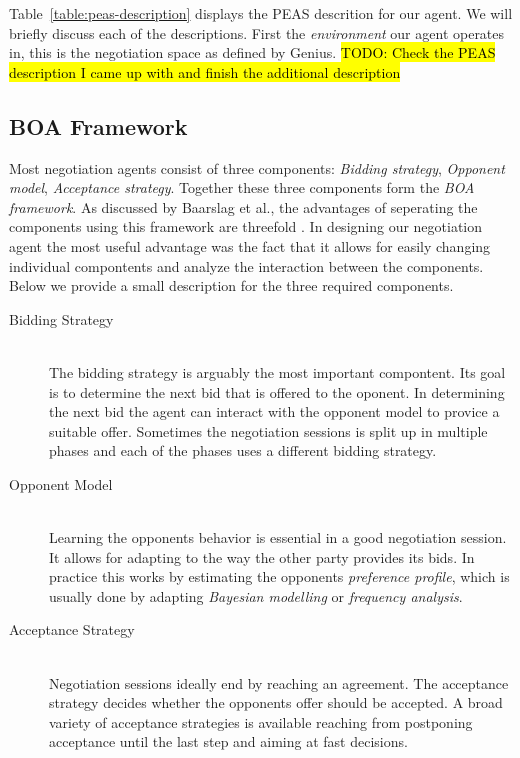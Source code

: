 \documentclass[a4paper,10pt]{article}
\newcommand{\todo}[1] {\hl{TODO: #1}}
\begin{document}
Table~\ref{table:peas-description} displays the PEAS descrition for our agent. We will briefly discuss each of the descriptions. First the \emph{environment} our agent operates in, this is the negotiation space as defined by Genius. \todo{Check the PEAS description I came up with and finish the additional description} 

\subsection{BOA Framework}

Most negotiation agents consist of three components: \emph{Bidding strategy}, \emph{Opponent model}, \emph{Acceptance strategy}. Together these three components form the \emph{BOA framework}. As discussed by Baarslag et al., the advantages of seperating the components using this framework are threefold \cite{baarslag2012decoupling}. In designing our negotiation agent the most useful advantage was the fact that it allows for easily changing individual compontents and analyze the interaction between the components. Below we provide a small description for the three required components.

\begin{description}
  \item[Bidding Strategy] \hfill \\
  The bidding strategy is arguably the most important compontent. Its goal is to determine the next bid that is offered to the oponent. In determining the next bid the agent can interact with the opponent model to provice a suitable offer. Sometimes the negotiation sessions is split up in multiple phases and each of the phases uses a different bidding strategy.

  \item[Opponent Model] \hfill \\
  Learning the opponents behavior is essential in a good negotiation session. It allows for adapting to the way the other party provides its bids. In practice this works by estimating the opponents \emph{preference profile}, which is usually done by adapting \emph{Bayesian modelling} or \emph{frequency analysis}.

  \item[Acceptance Strategy] \hfill \\
  Negotiation sessions ideally end by reaching an agreement. The acceptance strategy decides whether the opponents offer should be accepted. A broad variety of acceptance strategies is available reaching from postponing acceptance until the last step and aiming at fast decisions.

\end{description}
\end{document}

